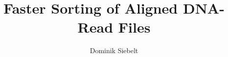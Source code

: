 \documentclass[runningheads]{llncs}
\renewcommand\#{\protect\scalebox{0.8}{\protect\raisebox{0.4ex}{\char"0023}}}
\begin{document}
%
\title{Faster Sorting of Aligned DNA-Read Files}
%
%
\author{Dominik Siebelt}
%
%
%
\maketitle              %
%
\end{document}
